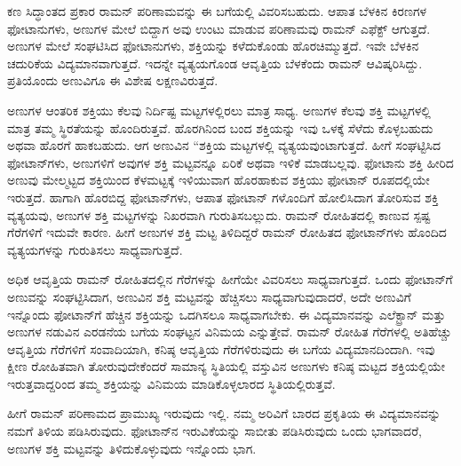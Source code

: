 ಕಣ ಸಿದ್ಧಾಂತದ ಪ್ರಕಾರ ರಾಮನ್ ಪರಿಣಾಮವನ್ನು ಈ ಬಗೆಯಲ್ಲಿ ವಿವರಿಸಬಹುದು. ಆಪಾತ ಬೆಳಕಿನ ಕಿರಣಗಳ ಫೋಟಾನುಗಳು, ಅಣುಗಳ ಮೇಲೆ ಬಿದ್ದಾಗ ಅವು ಉಂಟು ಮಾಡುವ ಪರಿಣಾಮವು ರಾಮನ್ ಎಫೆಕ್ಟ್ ಆಗುತ್ತದೆ. ಅಣುಗಳ ಮೇಲೆ ಸಂಘಟಿಸಿದ ಫೋಟಾನುಗಳು, ಶಕ್ತಿಯನ್ನು ಕಳೆದುಕೊಂಡು ಹೊರಚಿಮ್ಮುತ್ತದೆ. ಇವೇ ಬೆಳಕಿನ ಚದುರಿಕೆಯ ವಿದ್ಯಮಾನವಾಗುತ್ತದೆ. ಇದನ್ನೇ ವ್ಯತ್ಯಯಗೊಂಡ ಆವೃತ್ತಿಯ ಬೆಳಕೆಂದು ರಾಮನ್ ಆವಿಷ್ಕರಿಸಿದ್ದು. ಪ್ರತಿಯೊಂದು ಅಣುವಿಗೂ ಈ ವಿಶೇಷ ಲಕ್ಷಣವಿರುತ್ತದೆ.

ಅಣುಗಳ ಆಂತರಿಕ ಶಕ್ತಿಯು ಕೆಲವು ನಿರ್ದಿಷ್ಟ ಮಟ್ಟಗಳಲ್ಲಿರಲು ಮಾತ್ರ ಸಾಧ್ಯ. ಅಣುಗಳ ಕೆಲವು ಶಕ್ತಿ ಮಟ್ಟಗಳಲ್ಲಿ ಮಾತ್ರ ತಮ್ಮ ಸ್ಥಿರತೆಯನ್ನು ಹೊಂದಿರುತ್ತವೆ. ಹೊರಗಿನಿಂದ ಬಂದ ಶಕ್ತಿಯನ್ನು ಇವು ಒಳಕ್ಕೆ ಸೆಳೆದು ಕೊಳ್ಳಬಹುದು ಅಥವಾ ಹೊರಗೆ ಹಾಕಬಹುದು. ಆಗ ಅಣುವಿನ “ಶಕ್ತಿಯ ಮಟ್ಟಗಳಲ್ಲಿ ವ್ಯತ್ಯಯವುಂಟಾಗುತ್ತದೆ. ಹೀಗೆ ಸಂಘಟ್ಟಿಸಿದ ಫೋಟಾನ್‍ಗಳು, ಅಣುಗಳಿಗೆ ಅವುಗಳ ಶಕ್ತಿ ಮಟ್ಟವನ್ನೂ ಏರಿಕೆ ಅಥವಾ ಇಳಿಕೆ ಮಾಡಬಲ್ಲವು. ಫೋಟಾನು ಶಕ್ತಿ ಹೀರಿದ ಅಣುವು ಮೇಲ್ಮಟ್ಟದ ಶಕ್ತಿಯಿಂದ ಕೆಳಮಟ್ಟಕ್ಕೆ ಇಳಿಯುವಾಗ ಹೊರಹಾಕುವ ಶಕ್ತಿಯು ಫೋಟಾನ್ ರೂಪದಲ್ಲಿಯೇ ಇರುತ್ತದೆ. ಹಾಗಾಗಿ ಹೊರಬಿದ್ದ ಫೋಟಾನ್‍ಗಳು, ಆಪಾತ ಫೋಟಾನ್ ಗಳೊಂದಿಗೆ ಹೋಲಿಸಿದಾಗ ತೋರಿಸುವ ಶಕ್ತಿ ವ್ಯತ್ಯಯವು, ಅಣುಗಳ ಶಕ್ತಿ ಮಟ್ಟಗಳನ್ನು ನಿಖರವಾಗಿ ಗುರುತಿಸಬಲ್ಲುದು. ರಾಮನ್ ರೋಹಿತದಲ್ಲಿ ಕಾಣುವ ಸ್ಪಷ್ಟ ಗೆರೆಗಳಿಗೆ ಇದುವೇ ಕಾರಣ. ಹೀಗೆ ಅಣುಗಳ ಶಕ್ತಿ ಮಟ್ಟ ತಿಳಿದಿದ್ದರೆ ರಾಮನ್ ರೋಹಿತದ ಫೋಟಾನ್‍ಗಳು ಹೊಂದಿದ ವ್ಯತ್ಯಯಗಳನ್ನು ಗುರುತಿಸಲು ಸಾಧ್ಯವಾಗುತ್ತದೆ.

ಅಧಿಕ ಆವೃತ್ತಿಯ ರಾಮನ್ ರೋಹಿತದಲ್ಲಿನ ಗೆರೆಗಳನ್ನು ಹೀಗೆಯೇ ವಿವರಿಸಲು ಸಾಧ್ಯವಾಗುತ್ತದೆ. ಒಂದು ಫೋಟಾನ್‍ಗೆ ಅಣುವನ್ನು ಸಂಘಟ್ಟಿಸಿದಾಗ, ಅಣುವಿನ ಶಕ್ತಿ ಮಟ್ಟವನ್ನು ಹೆಚ್ಚಿಸಲು ಸಾಧ್ಯವಾಗುವುದಾದರೆ, ಅದೇ ಅಣುವಿಗೆ ಇನ್ನೊಂದು ಫೋಟಾನ್‍ಗೆ ಹೆಚ್ಚಿನ ಶಕ್ತಿಯನ್ನು ಒದಗಿಸಲೂ ಸಾಧ್ಯವಾಗಬೇಕು. ಈ ವಿದ್ಯಮಾನವನ್ನು ಎಲೆಕ್ಟ್ರಾನ್ ಮತ್ತು ಅಣುಗಳ ನಡುವಿನ ಎರಡನೆಯ ಬಗೆಯ ಸಂಘಟ್ಟನ ವಿನಿಮಯ ಎನ್ನುತ್ತೇವೆ. ರಾಮನ್ ರೋಹಿತ ಗೆರೆಗಳಲ್ಲಿ ಅತಿಹೆಚ್ಚು ಆವೃತ್ತಿಯ ಗೆರೆಗಳಿಗೆ ಸಂವಾದಿಯಾಗಿ, ಕನಿಷ್ಠ ಆವೃತ್ತಿಯ ಗೆರೆಗಳಿರುವುದು ಈ ಬಗೆಯ ವಿದ್ಯಮಾನದಿಂದಾಗಿ. ಇವು ಕ್ಷೀಣ ರೋಹಿತವಾಗಿ ತೋರುವುದೇಕೆಂದರೆ ಸಾಮಾನ್ಯ ಸ್ಥಿತಿಯಲ್ಲಿ ವಸ್ತುವಿನ ಅಣುಗಳು ಕನಿಷ್ಠ ಮಟ್ಟದ ಶಕ್ತಿಯಲ್ಲಿಯೇ ಇರುತ್ತವಾದ್ದರಿಂದ ತಮ್ಮ ಶಕ್ತಿಯನ್ನು ವಿನಿಮಯ ಮಾಡಿಕೊಳ್ಳಲಾರದ ಸ್ಥಿತಿಯಲ್ಲಿರುತ್ತವೆ.

ಹೀಗೆ ರಾಮನ್ ಪರಿಣಾಮದ ಪ್ರಾಮುಖ್ಯ ಇರುವುದು ಇಲ್ಲಿ. ನಮ್ಮ ಅರಿವಿಗೆ ಬಾರದ ಪ್ರಕೃತಿಯ ಈ ವಿದ್ಯಮಾನವನ್ನು ನಮಗೆ ತಿಳಿಯ ಪಡಿಸಿರುವುದು. ಫೋಟಾನ್‍ನ ಇರುವಿಕೆಯನ್ನು ಸಾಬೀತು ಪಡಿಸಿರುವುದು ಒಂದು ಭಾಗವಾದರೆ, ಅಣುಗಳ ಶಕ್ತಿ ಮಟ್ಟವನ್ನು ತಿಳಿದುಕೊಳ್ಳುವುದು ಇನ್ನೊಂದು ಭಾಗ.

